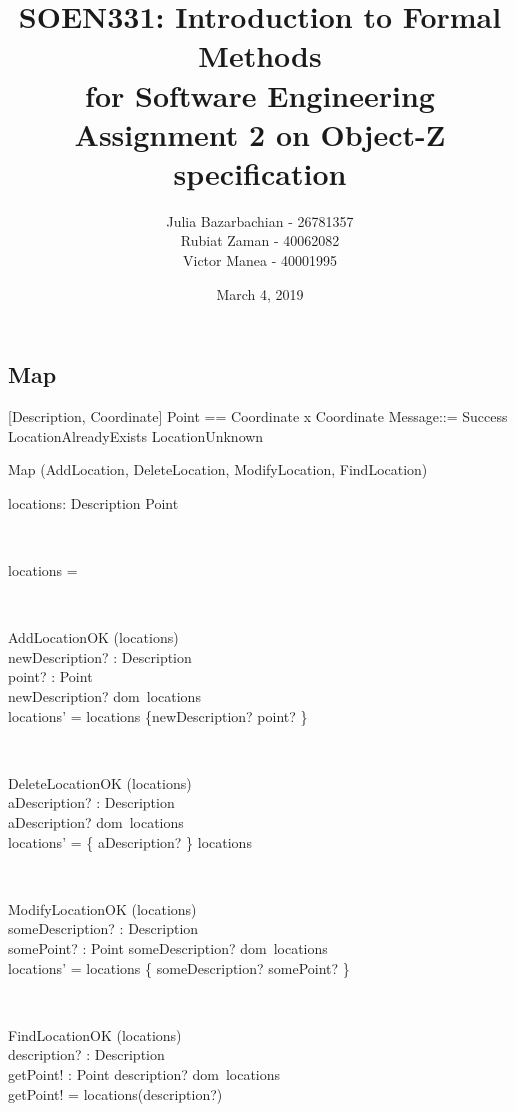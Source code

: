 \documentclass[12pt]{article}
\title{SOEN331: Introduction to Formal Methods\\for Software Engineering\\
Assignment 2 on Object-Z specification}
\author{Julia Bazarbachian - 26781357\\
Rubiat Zaman - 40062082\\
Victor Manea - 40001995}
\date{March 4, 2019}
\begin{document}
\begin{spacing}{1.5}

\maketitle

\newpage

\section{Map}

{[Description, Coordinate]}
{\newline Point == Coordinate x Coordinate}
{\newline Message::= Success \textbar LocationAlreadyExists \textbar LocationUnknown}

\begin{class}{Map}
\also
\upharpoonright (AddLocation, DeleteLocation, ModifyLocation, FindLocation) \\
\begin{state}
locations: Description \leftrightarrow Point
\end{state} \\
\begin{init}
locations = \emptyset %
\end{init} \\
\begin{op}{AddLocationOK}
\Delta (locations) \\
newDescription? : Description\\
point? : Point\\
\ST
newDescription? \notin dom~locations\\
locations' = locations \cup \{newDescription? \mapsto point? \}
\end{op}\\
\begin{op}{DeleteLocationOK}
\Delta (locations) \\
aDescription? : Description\\
\ST
aDescription? \in dom~locations\\
locations' = \{ aDescription? \} \ndres locations
\end{op}\\
\begin{op}{ModifyLocationOK}
\Delta (locations) \\
someDescription? : Description\\
somePoint? : Point
\ST
someDescription? \in dom~locations\\
locations' = locations \oplus \{ someDescription? \mapsto somePoint? \}
\end{op}\\
\begin{op}{FindLocationOK}
\Xi (locations) \\
description? : Description\\
getPoint! : Point
\ST
description? \in dom~locations\\
getPoint! = locations(description?)
\end{op}\\
\end{class}


\end{spacing}
\end{document}
